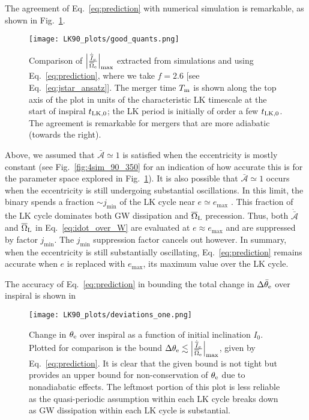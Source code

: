 \documentclass[
        fleqn,
        usenatbib,
    ]{mnras}
\newcommand*{\abs}[1]{\left|#1\right|}
\begin{document}
The agreement of Eq.~\eqref{eq:prediction} with numerical simulation is
remarkable, as shown in Fig.~\ref{fig:good_quants}.
\begin{figure}
    \centering
    \texttt{[image: LK90\_plots/good\_quants.png]}
    \caption{Comparison of $\abs{\frac{\dot{\overline{I}}_{\rm
    e}}{\overline{\Omega}_{\rm e}}}_{\max}$ extracted from simulations and using
    Eq.~\eqref{eq:prediction}, where we take $f = 2.6$ [see
    Eq.~\eqref{eq:jstar_ansatz}]. The merger time $T_{\rm m}$ is shown along the
    top axis of the plot in units of the characteristic LK timescale at the
    start of inspiral $t_{\rm LK, 0}$; the LK period is initially of order a few
    $t_{\rm LK, 0}$. The agreement is remarkable for mergers that are more
    adiabatic (towards the right).}\label{fig:good_quants}
\end{figure}

Above, we assumed that $\bar{\mathcal{A}} \simeq 1$ is satisfied when the
eccentricity is mostly constant (see Fig.~\ref{fig:4sim_90_350} for an
indication of how accurate this is for the parameter space explored in
Fig.~\ref{fig:good_quants}). It is also possible that $\bar{\mathcal{A}}
\simeq 1$ occurs when the eccentricity is still undergoing substantial
oscillations. In this limit, the binary spends a fraction $\sim j_{\min}$ of the
LK cycle near $e \simeq e_{\max}$ \citep{anderson2016formation}. This fraction
of the LK cycle dominates both GW dissipation and $\overline{\Omega}_{\rm L}$
precession. Thus, both $\dot{\bar{\mathcal{A}}}$ and
$\overline{\Omega}_{\rm L}$ in Eq.~\eqref{eq:idot_over_W} are evaluated at $e
\approx e_{\max}$ and are suppressed by factor $j_{\min}$. The $j_{\min}$
suppression factor cancels out however. In summary, when the eccentricity is
still substantially oscillating, Eq.~\eqref{eq:prediction} remains accurate when
$e$ is replaced with $e_{\max}$, its maximum value over the LK cycle.

The accuracy of Eq.~\eqref{eq:prediction} in bounding the total change in
$\Delta \bar{\theta}_{\rm e}$ over inspiral is shown in
\begin{figure}
    \centering
    \texttt{[image: LK90\_plots/deviations\_one.png]}
    \caption{Change in $\theta_{\rm e}$ over inspiral as a function of initial
    inclination $I_0$. Plotted for comparison is the bound $\Delta \theta_{\rm
    e} \lesssim \abs{\frac{\dot{\overline{I}}_{\rm
    e}}{\overline{\Omega}_{\rm e}}}_{\max}$, given by Eq.~\eqref{eq:prediction}.
    It is clear that the given bound is not tight but provides an upper bound
    for non-conservation of $\theta_{\rm e}$ due to nonadiabatic effects. The
    leftmost portion of this plot is less reliable as the quasi-periodic
    assumption within each LK cycle breaks down as GW dissipation within each LK
    cycle is substantial.}\label{fig:deviations}
\end{figure}
\end{document}
